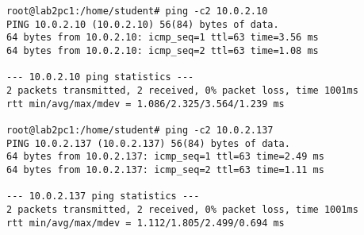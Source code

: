 \begin{lstlisting}
root@lab2pc1:/home/student# ping -c2 10.0.2.10
PING 10.0.2.10 (10.0.2.10) 56(84) bytes of data.
64 bytes from 10.0.2.10: icmp_seq=1 ttl=63 time=3.56 ms
64 bytes from 10.0.2.10: icmp_seq=2 ttl=63 time=1.08 ms

--- 10.0.2.10 ping statistics ---
2 packets transmitted, 2 received, 0% packet loss, time 1001ms
rtt min/avg/max/mdev = 1.086/2.325/3.564/1.239 ms

root@lab2pc1:/home/student# ping -c2 10.0.2.137
PING 10.0.2.137 (10.0.2.137) 56(84) bytes of data.
64 bytes from 10.0.2.137: icmp_seq=1 ttl=63 time=2.49 ms
64 bytes from 10.0.2.137: icmp_seq=2 ttl=63 time=1.11 ms

--- 10.0.2.137 ping statistics ---
2 packets transmitted, 2 received, 0% packet loss, time 1001ms
rtt min/avg/max/mdev = 1.112/1.805/2.499/0.694 ms
\end{lstlisting}
